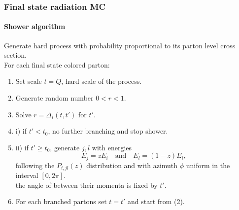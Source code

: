 \documentclass[aspectratio=43]{beamer}
\begin{document}
\begin{frame}

	\frametitle{Final state radiation MC}
	\framesubtitle{Shower algorithm}
	
	\footnotesize Generate hard process with probability proportional to its parton level cross section. \\
	\footnotesize For each final state colored parton:
	\begin{enumerate} 
		\item \footnotesize Set scale $t = Q$, hard scale of the process.
		\item \footnotesize Generate random number $0 < r < 1$.
		\item \footnotesize Solve $r = \Delta_{i}(t, t')$ for $t'.$
		\item \footnotesize i) if $t' < t_{0}$, no further branching and stop shower.
		\item \footnotesize ii) if $t' \geq t_{0}$, generate $j, l$ with energies $$E_{j} = zE_{i} \quad \textrm{and}\quad E_{l} = (1 - z)E_{i}, $$ following the $P_{i, jl}(z)$ distribution and with azimuth $\phi$ uniform in the interval $[0, 2\pi]$. \\
		the angle of between their momenta is fixed by $t'$.
		\item \footnotesize For each branched partons set $t = t'$ and start from (2).
	\end{enumerate}

\end{frame}
\end{document}
